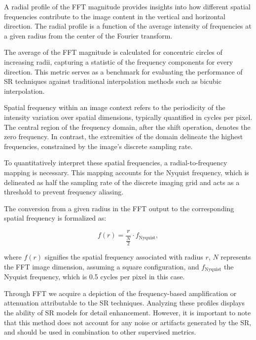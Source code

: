         A radial profile of the FFT magnitude provides insights into how different spatial frequencies contribute to the image content in the vertical and horizontal direction. The radial profile is a function of the average intensity of frequencies at a given radius from the center of the Fourier transform.
        
        The average of the FFT magnitude is calculated for concentric circles of increasing radii, capturing a statistic of the frequency components for every direction. This metric serves as a benchmark for evaluating the performance of SR techniques against traditional interpolation methods such as bicubic interpolation.

        Spatial frequency within an image context refers to the periodicity of the intensity variation over spatial dimensions, typically quantified in cycles per pixel. The central region of the frequency domain, after the shift operation, denotes the zero frequency. In contrast, the extremities of the domain delineate the highest frequencies, constrained by the image's discrete sampling rate.

        To quantitatively interpret these spatial frequencies, a radial-to-frequency mapping is necessary. This mapping accounts for the Nyquist frequency, which is delineated as half the sampling rate of the discrete imaging grid and acts as a threshold to prevent frequency aliasing.

        The conversion from a given radius in the FFT output to the corresponding spatial frequency is formalized as:

        \begin{equation}
            f(r) = \frac{r}{\frac{N}{2}} \cdot f_{\text{Nyquist}},
        \end{equation}

        where \( f(r) \) signifies the spatial frequency associated with radius \( r \), \( N \) represents the FFT image dimension, assuming a square configuration, and \( f_{\text{Nyquist}} \) the Nyquist frequency, which is 0.5 cycles per pixel in this case.

        Through FFT we acquire a depiction of the frequency-based amplification or attenuation attributable to the SR techniques. Analyzing these profiles displays the ability of SR models for detail enhancement. However, it is important to note that this method does not account for any noise or artifacts generated by the SR, and should be used in combination to other supervised metrics.

